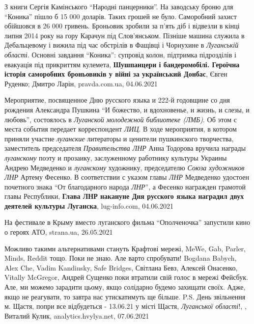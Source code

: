 З книги Сергія Камінського \enquote{Народні панцерники}.  На заводську броню
для \enquote{Коника} пішло б 15 000 доларів. Таких грошей не було. Саморобний
захист обійшовся в 26 000 гривень. Броньовик зробили за п'ять діб і відвезли в
кінці липня 2014 року на гору Карачун під Слов'янськом.  Пізніше машина служила
в Дебальцевому і вижила під час обстрілів в Фащівці і Чорнухине в \emph{Луганській
області}. Основні завдання \enquote{Коника}: супровід колон, підтримка
підрозділів і евакуація під прикриттям кулемета,
\textbf{Шушпанцери і бандеромобілі. Героїчна історія саморобних броньовиків у війні за український Донбас},
Євген Руденко; Дмитро Ларін, pravda.com.ua, 04.06.2021

Мероприятие, посвященное Дню русского языка и 222-й годовщине со дня рождения
Александра Пушкина \enquote{И божество, и вдохновенье, и жизнь, и слезы, и
любовь}, состоялось в \emph{Луганской молодежной библиотеке (ЛМБ)}. Об этом с места
события передает корреспондент \emph{ЛИЦ}. В ходе мероприятия, в котором приняли
участие \emph{луганские} литераторы и ценители пушкинского творчества,
заместитель председателя \emph{Правительства ЛНР} Анна Тодорова вручила награды
\emph{луганскому} поэту и прозаику, заслуженному работнику культуры Украины
Андрею Медведенко и \emph{луганскому} художнику, председателю \emph{Союза художников
ЛНР} Артему Фесенко. В соответствии с указом главы \emph{ЛНР} Медведенко удостоен
почетного знака \enquote{От благодарного народа \emph{ЛНР}}, а Фесенко награжден
грамотой главы Республики,
\textbf{Глава ЛНР накануне Дня русского языка наградил двух деятелей культуры Луганска},
lug-info.com, 04.06.2021

На фестивале в Крыму вместо луганского фильма \enquote{Ополченочка} запустили кино о героях АТО,
strana.ua, 26.05.2021

Можливо такими альтернативами стануть Крафтові мережі, MeWe, Gab, Parler,
Minds, Reddit тощо. Поки не знаю. Але варто спробувати!  Bogdana Babych, Alex
Che, Vadim Kandinsky, Safe Bridges, Світлана Бевз, Алексей Онасенко, Vitally
McGregor, Андрей Сущенко поки втратили свій голос в мережі Фейсбук.  Але, ми
можемо зарадити цьому, якщо солідарно будемо захищати своїх. Адже, якщо не
реагувати, то завтра нас утискатимуть ще більше.  P.S. День звільнення м.
Щастя, попри все відбудеться - 13.06.21 у місті Щастя, \emph{Луганської
області}!,
, Виталий Кулик, analytics.hvylya.net, 07.06.2021



